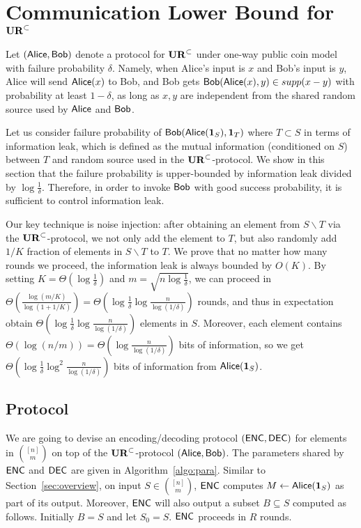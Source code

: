 \section{Communication Lower Bound for $\mathbf{UR}^\subset$} \label{sec:optimal-lb}


Let $(\mathsf{Alice}, \mathsf{Bob})$ denote a protocol for $\mathbf{UR}^\subset$ under one-way public coin model with failure probability $\delta$.
Namely, when Alice's input is $x$ and Bob's input is $y$, Alice will send $\mathsf{Alice}(x)$ to Bob, and Bob gets $\mathsf{Bob}(\mathsf{Alice}(x), y)\in supp(x-y)$ with probability at least $1-\delta$, as long as $x,y$ are independent from the shared random source used by $\mathsf{Alice}$ and $\mathsf{Bob}$. 

Let us consider failure probability of $\mathsf{Bob}(\mathsf{Alice}(\mathbf{1}_S), \mathbf{1}_T)$ where $T\subset S$ in terms of information leak, which is defined as the mutual information (conditioned on $S$) between $T$ and random source used in the $\mathbf{UR}^\subset$-protocol. 
We show in this section that the failure probability is upper-bounded by information leak divided by $\log \frac{1}{\delta}$. 
Therefore, in order to invoke $\mathsf{Bob}$ with good success probability, it is sufficient to control information leak.

Our key technique is noise injection: after obtaining an element from $S\backslash T$ via the $\mathbf{UR}^\subset$-protocol, we not only add the element to $T$, but also randomly add $1/K$ fraction of elements in $S\backslash T$ to $T$. 
We prove that no matter how many rounds we proceed, the information leak is always bounded by $O(K)$. 
By setting $K=\Theta(\log \frac{1}{\delta})$ and $m=\sqrt{n\log\frac{1}{\delta}}$, we can proceed in $\Theta(\frac{\log (m/K)}{\log (1 +1/K)}) = \Theta(\log\frac{1}{\delta}\log\frac{n}{\log(1/\delta)})$ rounds, and thus in expectation obtain $\Theta(\log\frac{1}{\delta}\log\frac{n}{\log(1/\delta)})$ elements in $S$.
Moreover, each element contains $\Theta(\log(n/m))=\Theta(\log \frac{n}{\log (1/\delta)})$ bits of information, so we get $\Theta(\log \frac{1}{\delta}\log^2 \frac{n}{\log (1/\delta)}) $ bits of information from $\mathsf{Alice}(\mathbf{1}_S)$. 

\subsection{Protocol}
We are going to devise an encoding/decoding protocol $(\textsf{ENC}, \textsf{DEC})$ for elements in ${[n] \choose m}$ on top of the $\mathbf{UR}^\subset$-protocol $(\mathsf{Alice}, \mathsf{Bob})$.
The parameters shared by $\textsf{ENC}$ and $\textsf{DEC}$ are given in Algorithm~\ref{algo:para}.
Similar to Section~\ref{sec:overview}, on input $S\in {[n] \choose m}$, $\textsf{ENC}$ computes $M \leftarrow \mathsf{Alice}(\mathbf{1}_S)$ as part of its output. 
Moreover, $\textsf{ENC}$ will also output a subset $B\subseteq S$ computed as follows.
Initially $B=S$ and let $S_0=S$. $\textsf{ENC}$ proceeds in $R$ rounds. 

